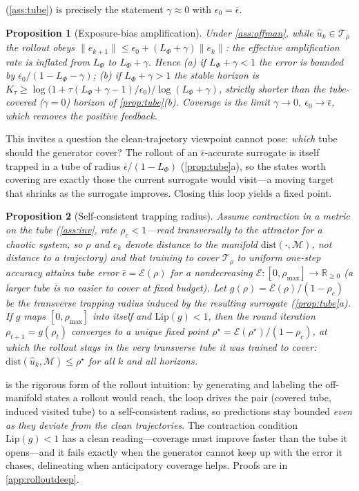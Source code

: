 \documentclass{article}
\theoremstyle{plain}
\newtheorem{proposition}{Proposition}
\theoremstyle{definition}
\theoremstyle{remark}
\newcommand{\R}{\mathbb{R}}
\newcommand{\state}{u}
\newcommand{\manifold}{\mathcal{M}}
\newcommand{\sol}{\Phi}
\newcommand{\tube}{\mathcal{T}_{\rho}}
\newcommand{\dist}{\mathrm{dist}}
\begin{document}
(\cref{ass:tube}) is precisely the statement $\gamma\!\approx\!0$ with $\epsilon_0=\bar\epsilon$.
\begin{proposition}[Exposure-bias amplification]\label{prop:exposure}
Under \cref{ass:offman}, while $\hat\state_k\in\tube$ the rollout obeys
$\|e_{k+1}\|\le\epsilon_0+(L_{\sol}+\gamma)\|e_k\|$: the effective amplification rate is inflated from
$L_{\sol}$ to $L_{\sol}+\gamma$. Hence (a) if $L_{\sol}+\gamma<1$ the error is bounded by
$\epsilon_0/(1-L_{\sol}-\gamma)$; (b) if $L_{\sol}+\gamma>1$ the stable horizon is
$K_\tau\ge\log\!\bigl(1+\tau(L_{\sol}+\gamma-1)/\epsilon_0\bigr)/\log(L_{\sol}+\gamma)$, strictly shorter
than the tube-covered ($\gamma=0$) horizon of \cref{prop:tube}(b). Coverage is the limit
$\gamma\!\to\!0,\ \epsilon_0\!\to\!\bar\epsilon$, which removes the positive feedback.
\end{proposition}

This invites a question the clean-trajectory viewpoint cannot pose: \emph{which} tube should the generator
cover? The rollout of an $\bar\epsilon$-accurate surrogate is itself trapped in a tube of radius
$\bar\epsilon/(1-L_{\sol})$ (\cref{prop:tube}a), so the states worth covering are exactly those the current
surrogate would visit---a moving target that shrinks as the surrogate improves. Closing this loop yields a
fixed point.
\begin{proposition}[Self-consistent trapping radius]\label{prop:selfconsistency}
Assume contraction in a metric on the tube (\cref{ass:inv}, rate $\rho_c<1$---read \emph{transversally} to
the attractor for a chaotic system, so $\rho$ and $e_k$ denote distance to the manifold $\dist(\cdot,\manifold)$,
not distance to a trajectory) and that training to cover $\tube$ to uniform one-step accuracy attains tube
error $\bar\epsilon=\mathcal E(\rho)$ for a nondecreasing $\mathcal E:[0,\rho_{\max}]\to\R_{\ge0}$ (a larger
tube is no easier to cover at fixed budget). Let $g(\rho)=\mathcal E(\rho)/(1-\rho_c)$ be the transverse
trapping radius induced by the resulting surrogate (\cref{prop:tube}a). If $g$ maps $[0,\rho_{\max}]$ into
itself and $\mathrm{Lip}(g)<1$, then the round iteration $\rho_{t+1}=g(\rho_t)$ converges to a unique fixed
point $\rho^\star=\mathcal E(\rho^\star)/(1-\rho_c)$, at which the rollout stays in the very transverse tube
it was trained to cover: $\dist(\hat\state_k,\manifold)\le\rho^\star$ for all $k$ and all horizons.
\end{proposition}
 is the rigorous form of the rollout intuition: by generating and labeling the
off-manifold states a rollout would reach, the loop drives the pair (covered tube, induced visited tube)
to a self-consistent radius, so predictions stay bounded \emph{even as they deviate from the clean
trajectories}. The contraction condition $\mathrm{Lip}(g)<1$ has a clean reading---coverage must improve
faster than the tube it opens---and it fails exactly when the generator cannot keep up with the error it
chases, delineating when anticipatory coverage helps. Proofs are in \cref{app:rolloutdeep}.
\end{document}

